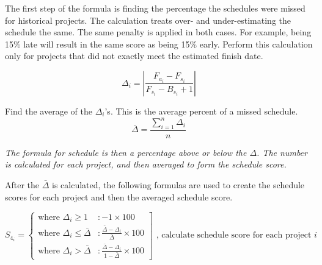 \documentclass[SDSUThesis.tex]{subfiles}
\begin{document}
                The first step of the formula is finding the percentage the schedules were missed for 
                historical projects.  The calculation treats over- and under-estimating the schedule
                the same.  The same penalty is applied in both cases.  For example, being 15\% late
                will result in the same score as being 15\% early. Perform this calculation
                only for projects that did not exactly meet the estimated finish date.
                
                \begin{displaymath}
                    \Delta_i = \left| \frac{F_{a_i} - F_{s_i}}{ F_{s_i} - B_{s_i} + 1} \right|
                \end{displaymath}
                
                Find the average of the $\Delta_i$'s.  This is the average percent of a missed
                schedule.  
                \begin{displaymath}
                   \bar{\Delta}  = \frac{\sum^n_{i=1}\Delta_i}{n}
                \end{displaymath}
                
                \textit{The formula for schedule is then a percentage above or below the $\Delta$.  
                The number is calculated for each project, and then averaged to form the schedule score.}
                
                After the $\bar{\Delta}$ is calculated, the following formulas are used to create the schedule scores
                for each project and then the averaged schedule score.
            
                \begin{displaymath}
                   S_{4_i} = \left\{
                     \begin{array}{lr}
                        \text{where } \Delta_i \geq 1 & : -1 \times 100 \\
                       \text{where }  \Delta_i \leq \bar{\Delta} & : \frac{\bar{\Delta} - \Delta_i}{\bar{\Delta}}   \times 100  \\
                       \text{where } \Delta_i > \bar{\Delta} & : \frac{\bar{\Delta} - \Delta_i}{1 - \bar{\Delta}} \times 100
                     \end{array}
                   \right] \text{   , calculate schedule score for each project $i$}
                \end{displaymath} 
        
\end{document}
